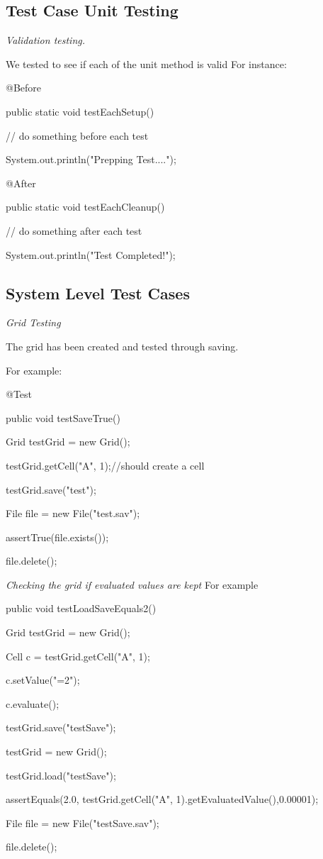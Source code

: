 \documentclass[12pt]{article}
\begin{document}
\subsection{Test Case Unit Testing}
{\it
Validation testing.

We tested to see if each of the unit method is valid
For instance:
}

  @Before

  public static void testEachSetup() {

    // do something before each test

    System.out.println("Prepping Test....");

  }
  
  @After

  public static void testEachCleanup() {

    // do something after each test

    System.out.println("Test Completed!");

  }



\subsection{System Level Test Cases}

{\it Grid Testing
}

The grid has been created and tested through saving.

For example:

  @Test

  public void testSaveTrue() {

	    Grid testGrid = new Grid();

	    testGrid.getCell("A", 1);//should create a cell

	    testGrid.save("test");

	    File file = new File("test.sav");

	    assertTrue(file.exists());

	    file.delete();

  }

{\it Checking the grid if evaluated values are kept
}
For example

public void testLoadSaveEquals2() {
	  
	    Grid testGrid = new Grid();

	    Cell c = testGrid.getCell("A", 1);

	    c.setValue("=2");

	    c.evaluate();
	    


	    testGrid.save("testSave");

	    testGrid = new Grid();

	    testGrid.load("testSave");

	    assertEquals(2.0, testGrid.getCell("A", 1).getEvaluatedValue(),0.00001);

	    File file = new File("testSave.sav");

	    file.delete();

  }
\end{document}

